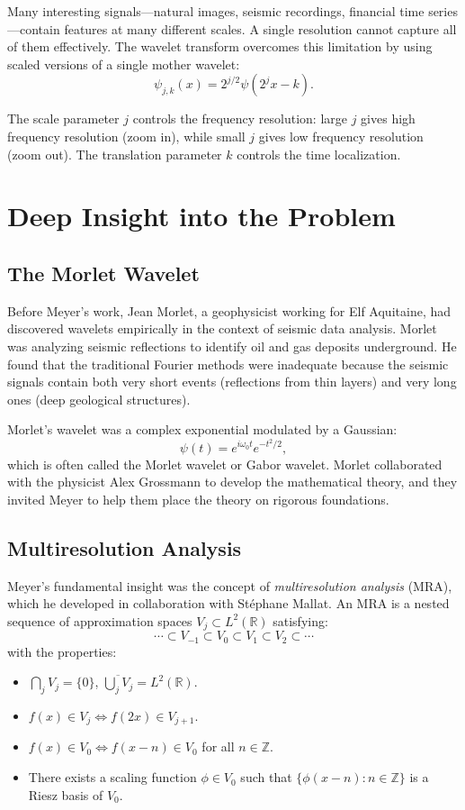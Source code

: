 Many interesting signals---natural images, seismic recordings, financial time series---contain features at many different scales. A single resolution cannot capture all of them effectively. The wavelet transform overcomes this limitation by using scaled versions of a single mother wavelet:
\[
\psi_{j,k}(x) = 2^{j/2} \psi(2^j x - k).
\]

The scale parameter $j$ controls the frequency resolution: large $j$ gives high frequency resolution (zoom in), while small $j$ gives low frequency resolution (zoom out). The translation parameter $k$ controls the time localization.

\section{Deep Insight into the Problem}

\subsection{The Morlet Wavelet}

Before Meyer's work, Jean Morlet, a geophysicist working for Elf Aquitaine, had discovered wavelets empirically in the context of seismic data analysis. Morlet was analyzing seismic reflections to identify oil and gas deposits underground. He found that the traditional Fourier methods were inadequate because the seismic signals contain both very short events (reflections from thin layers) and very long ones (deep geological structures).

Morlet's wavelet was a complex exponential modulated by a Gaussian:
\[
\psi(t) = e^{i\omega_0 t} e^{-t^2/2},
\]
which is often called the Morlet wavelet or Gabor wavelet. Morlet collaborated with the physicist Alex Grossmann to develop the mathematical theory, and they invited Meyer to help them place the theory on rigorous foundations.

\subsection{Multiresolution Analysis}

Meyer's fundamental insight was the concept of \emph{multiresolution analysis} (MRA), which he developed in collaboration with St\'ephane Mallat. An MRA is a nested sequence of approximation spaces $V_j \subset L^2(\mathbb{R})$ satisfying:
\[
\cdots \subset V_{-1} \subset V_0 \subset V_1 \subset V_2 \subset \cdots
\]
with the properties:
\begin{itemize}
\item $\bigcap_{j} V_j = \{0\}$, $\overline{\bigcup_j V_j} = L^2(\mathbb{R})$.
\item $f(x) \in V_j \iff f(2x) \in V_{j+1}$.
\item $f(x) \in V_0 \iff f(x-n) \in V_0$ for all $n \in \mathbb{Z}$.
\item There exists a scaling function $\phi \in V_0$ such that $\{\phi(x-n) : n \in \mathbb{Z}\}$ is a Riesz basis of $V_0$.
\end{itemize}

